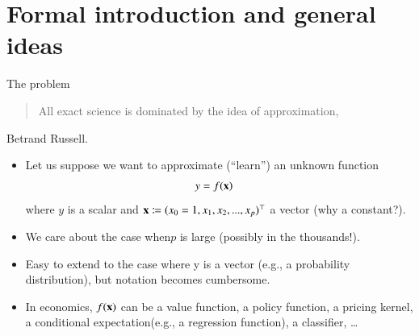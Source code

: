 \documentclass[notes, ignorenonframetext, compress, 10pt, xcolor=svgnames, aspectratio=169]{beamer}
\begin{document}
\section{Formal introduction and general ideas}
\frame{\sectionpage}
\begin{frame}[allowframebreaks]{The problem}
  \begin{quote}
    All exact science is dominated by the idea of approximation,
  \end{quote}
  Betrand Russell.
\begin{itemize}
\item Let us suppose we want to approximate (“learn”) an unknown function
\begin{align*}
y &= f ({\mathbf x})
\end{align*}
where $y$ is a scalar and ${\mathbf x} \coloneqq (x_0 = 1, x_1, x_2, ..., x_p)^\top$ a vector (why a constant?).
\item We care about the case when$ p$ is large (possibly in the thousands!).
\item Easy to extend to the case where y is a vector (e.g., a probability distribution), but notation becomes
cumbersome.
\item In economics, $f ({\mathbf x})$ can be a value function, a policy function, a pricing kernel, a conditional
expectation(e.g., a regression function), a classifier, \ldots
\end{itemize}

\end{frame}
\end{document}
